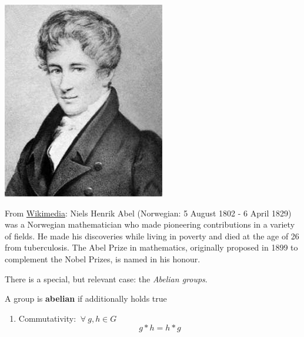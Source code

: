 \documentclass[../main.tex]{subfiles}
\begin{document}
\begin{marginfigure}
	\includegraphics[width=1\linewidth]{images/Niels_Henrik_Abel.jpg}
	\caption[Photo of Niels Henrik Abel]{From \href{https://commons.wikimedia.org/wiki/File:Niels_Henrik_Abel.jpg}{Wikimedia}: Niels Henrik Abel (Norwegian: 5 August 1802 - 6 April 1829) was a Norwegian mathematician who made pioneering contributions in a variety of fields. He made his discoveries while living in poverty and died at the age of 26 from tuberculosis. The Abel Prize in mathematics, originally proposed in 1899 to complement the Nobel Prizes, is named in his honour.}
\end{marginfigure}
There is a special, but relevant case: the \textit{Abelian groups}.
\begin{definition}
A group is \textbf{abelian} if additionally holds true
\renewcommand{\labelenumi}{(G4)}
\begin{enumerate}
    \item Commutativity: \(\ \forall \ g,h\in G\)
    \[
    g\ast h = h\ast g
    \]
\end{enumerate}
\end{definition}
\end{document}
